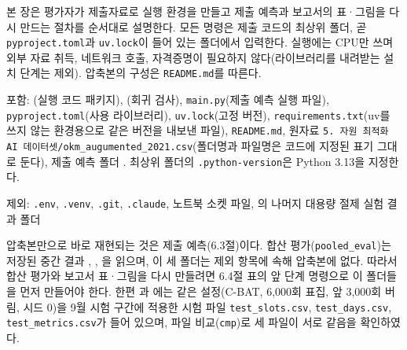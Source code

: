\newcommand{\sixopen}{\begin{list}{}{\setlength{\leftmargin}{2em}\setlength{\topsep}{0.2ex}\setlength{\parsep}{0pt}\setlength{\itemsep}{0pt}}\item[]\raggedright\ttfamily\small}
\newcommand{\sixclose}{\end{list}}
\begingroup\setlength{\emergencystretch}{3em}



본 장은 평가자가 제출자료로 실행 환경을 만들고 제출 예측과 보고서의 표·그림을 다시 만드는 절차를 순서대로 설명한다. 모든 명령은 제출 코드의 최상위 폴더, 곧 \texttt{pyproject.toml}과 \texttt{uv.lock}이 들어 있는 폴더에서 입력한다. 실행에는 CPU만 쓰며 외부 자료 취득, 네트워크 호출, 자격증명이 필요하지 않다(라이브러리를 내려받는 설치 단계는 제외). 압축본의 구성은 \texttt{README.md}를 따른다.
\begin{hwplist}
\item 포함: (실행 코드 패키지), (회귀 검사), \texttt{main.py}(제출 예측 실행 파일), \texttt{pyproject.toml}(사용 라이브러리), \texttt{uv.lock}(고정 버전), \texttt{requirements.txt}(uv를 쓰지 않는 환경용으로 같은 버전을 내보낸 파일), \texttt{README.md}, 원자료 \texttt{5. 자원 최적화 AI 데이터셋/okm\_augumented\_2021.csv}(폴더명과 파일명은 코드에 지정된 표기 그대로 둔다), 제출 예측 폴더 . 최상위 폴더의 \texttt{.python-version}은 Python 3.13을 지정한다.
\item 제외: \texttt{.env}, \texttt{.venv}, \texttt{.git}, \texttt{.claude}, 노트북 소켓 파일, 의 나머지 대용량 절제 실험 결과 폴더
\end{hwplist}

압축본만으로 바로 재현되는 것은 제출 예측(6.3절)이다. 합산 평가(\texttt{pooled\_eval})는 저장된 중간 결과 , , 을 읽으며, 이 세 폴더는 제외 항목에 속해 압축본에 없다. 따라서 합산 평가와 보고서 표·그림을 다시 만들려면 6.4절 표의 앞 단계 명령으로 이 폴더들을 먼저 만들어야 한다. 한편 과 에는 같은 설정(C-BAT, 6,000회 표집, 앞 3,000회 버림, 시드 0)을 9월 시험 구간에 적용한 시험 파일 \texttt{test\_slots.csv}, \texttt{test\_days.csv}, \texttt{test\_metrics.csv}가 들어 있으며, 파일 비교(\texttt{cmp})로 세 파일이 서로 같음을 확인하였다.

